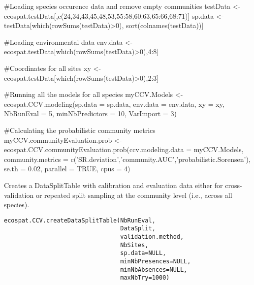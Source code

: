 \documentclass[a4paper]{book}
\begin{document}
\begin{Examples}
\begin{ExampleCode}
#Loading species occurence data and remove empty communities
testData <- ecospat.testData[,c(24,34,43,45,48,53,55:58,60:63,65:66,68:71)]
sp.data <- testData[which(rowSums(testData)>0), sort(colnames(testData))]

#Loading environmental data
env.data <- ecospat.testData[which(rowSums(testData)>0),4:8]

#Coordinates for all sites
xy <- ecospat.testData[which(rowSums(testData)>0),2:3]

#Running all the models for all species
myCCV.Models <- ecospat.CCV.modeling(sp.data = sp.data,
                                     env.data = env.data,
                                     xy = xy,
                                     NbRunEval = 5,
                                     minNbPredictors = 10,
                                     VarImport = 3)
                                     
#Calculating the probabilistic community metrics
myCCV.communityEvaluation.prob <- ecospat.CCV.communityEvaluation.prob(ccv.modeling.data = myCCV.Models, 
                                                                       community.metrics = c('SR.deviation','community.AUC','probabilistic.Sorensen'), 
                                                                       se.th = 0.02, 
                                                                       parallel = TRUE, 
                                                                       cpus = 4)
\end{ExampleCode}
\end{Examples}
%
\begin{Description}\relax
Creates a DataSplitTable with calibration and evaluation data either for cross-validation or repeated split sampling at the community level (i.e., across all species).

\end{Description}
%
\begin{Usage}
\begin{verbatim}
ecospat.CCV.createDataSplitTable(NbRunEval, 
                                 DataSplit,
                                 validation.method,
                                 NbSites,
                                 sp.data=NULL,
                                 minNbPresences=NULL,
                                 minNbAbsences=NULL,
                                 maxNbTry=1000)
\end{verbatim}
\end{Usage}
\end{document}
